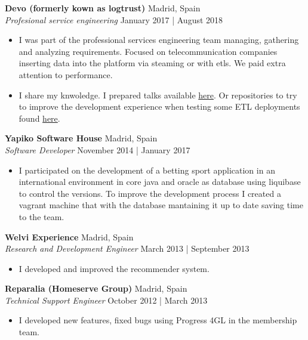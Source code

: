 \documentclass[a4paper]{article}
\begin{document}
\textbf{Devo (formerly kown as logtrust)} \hfill Madrid, Spain\\
\textit{Profesional service engineering} \hfill January 2017 | August 2018\\
\vspace{-1mm}
\begin{itemize} \itemsep 1pt
	\item I was part of the professional services engineering team managing, gathering and analyzing requirements. Focused on telecommunication companies inserting data into the platform via steaming or with etls. We paid extra attention to performance.
	\item I share my knwoledge. I prepared talks available \href{https://github.com/dionisioC/pythonPerformance}{here}. Or repositories to try to improve the development experience when testing some ETL deployments found \href{https://github.com/dionisioC/azkaban_in_vagrant_with_ansible}{here}.
\end{itemize}

\textbf{Yapiko Software House} \hfill Madrid, Spain\\
\textit{Software Developer} \hfill November 2014 | January 2017\\
\vspace{-1mm}
\begin{itemize} \itemsep 1pt
 	\item I participated on the development of a betting sport application in an international environment in core java and oracle as database using liquibase to control the versions. To improve the development process I created a vagrant machine that with the database mantaining it up to date saving time to the team.
\end{itemize}

\textbf{Welvi Experience} \hfill Madrid, Spain\\
\textit{Research and Development Engineer} \hfill March 2013 | September 2013\\
\vspace{-1mm}
\begin{itemize} \itemsep 1pt
	\item I developed and improved the recommender system.
\end{itemize}

\textbf{Reparalia (Homeserve Group)} \hfill Madrid, Spain\\
\textit{Technical Support Engineer} \hfill October 2012 | March 2013\\
\vspace{-1mm}
\begin{itemize} \itemsep 1pt
	\item I developed new features, fixed bugs using Progress 4GL in the membership team.
\end{itemize}
\end{document}
